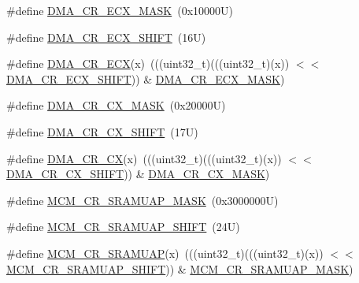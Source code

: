 \begin{DoxyCompactItemize}
\item 
\#define \mbox{\hyperlink{group___d_m_a___register___masks_ga8cd29e6014e34b164ffa8ebd3287291b}{D\+M\+A\+\_\+\+C\+R\+\_\+\+E\+C\+X\+\_\+\+M\+A\+SK}}~(0x10000\+U)
\item 
\#define \mbox{\hyperlink{group___d_m_a___register___masks_ga652ead499d504b771d8c4d036ff020a8}{D\+M\+A\+\_\+\+C\+R\+\_\+\+E\+C\+X\+\_\+\+S\+H\+I\+FT}}~(16\+U)
\item 
\#define \mbox{\hyperlink{group___d_m_a___register___masks_ga34f3465d8d2aed7516f9ee01516a4acd}{D\+M\+A\+\_\+\+C\+R\+\_\+\+E\+CX}}(x)~(((uint32\+\_\+t)(((uint32\+\_\+t)(x)) $<$$<$ \mbox{\hyperlink{group___d_m_a___register___masks_ga652ead499d504b771d8c4d036ff020a8}{D\+M\+A\+\_\+\+C\+R\+\_\+\+E\+C\+X\+\_\+\+S\+H\+I\+FT}})) \& \mbox{\hyperlink{group___d_m_a___register___masks_ga8cd29e6014e34b164ffa8ebd3287291b}{D\+M\+A\+\_\+\+C\+R\+\_\+\+E\+C\+X\+\_\+\+M\+A\+SK}})
\item 
\#define \mbox{\hyperlink{group___d_m_a___register___masks_ga8ea20ed0397a7d48d51fd96b717534d1}{D\+M\+A\+\_\+\+C\+R\+\_\+\+C\+X\+\_\+\+M\+A\+SK}}~(0x20000\+U)
\item 
\#define \mbox{\hyperlink{group___d_m_a___register___masks_ga270e606ced175537eadb3762f1de1b9e}{D\+M\+A\+\_\+\+C\+R\+\_\+\+C\+X\+\_\+\+S\+H\+I\+FT}}~(17\+U)
\item 
\#define \mbox{\hyperlink{group___d_m_a___register___masks_gace92741980f3ecf05009e19fb989baf5}{D\+M\+A\+\_\+\+C\+R\+\_\+\+CX}}(x)~(((uint32\+\_\+t)(((uint32\+\_\+t)(x)) $<$$<$ \mbox{\hyperlink{group___d_m_a___register___masks_ga270e606ced175537eadb3762f1de1b9e}{D\+M\+A\+\_\+\+C\+R\+\_\+\+C\+X\+\_\+\+S\+H\+I\+FT}})) \& \mbox{\hyperlink{group___d_m_a___register___masks_ga8ea20ed0397a7d48d51fd96b717534d1}{D\+M\+A\+\_\+\+C\+R\+\_\+\+C\+X\+\_\+\+M\+A\+SK}})
\item 
\#define \mbox{\hyperlink{group___d_m_a___register___masks_ga39213f9a00cf1862ab3e77c839e71c78}{M\+C\+M\+\_\+\+C\+R\+\_\+\+S\+R\+A\+M\+U\+A\+P\+\_\+\+M\+A\+SK}}~(0x3000000\+U)
\item 
\#define \mbox{\hyperlink{group___d_m_a___register___masks_ga4608d3fb1b05eb0d37515c4686f6190c}{M\+C\+M\+\_\+\+C\+R\+\_\+\+S\+R\+A\+M\+U\+A\+P\+\_\+\+S\+H\+I\+FT}}~(24\+U)
\item 
\#define \mbox{\hyperlink{group___d_m_a___register___masks_gab9b0e14b6d8b8eb48c993e37da8fd709}{M\+C\+M\+\_\+\+C\+R\+\_\+\+S\+R\+A\+M\+U\+AP}}(x)~(((uint32\+\_\+t)(((uint32\+\_\+t)(x)) $<$$<$ \mbox{\hyperlink{group___d_m_a___register___masks_ga4608d3fb1b05eb0d37515c4686f6190c}{M\+C\+M\+\_\+\+C\+R\+\_\+\+S\+R\+A\+M\+U\+A\+P\+\_\+\+S\+H\+I\+FT}})) \& \mbox{\hyperlink{group___d_m_a___register___masks_ga39213f9a00cf1862ab3e77c839e71c78}{M\+C\+M\+\_\+\+C\+R\+\_\+\+S\+R\+A\+M\+U\+A\+P\+\_\+\+M\+A\+SK}})
$$
\end{DoxyCompactItemize}

